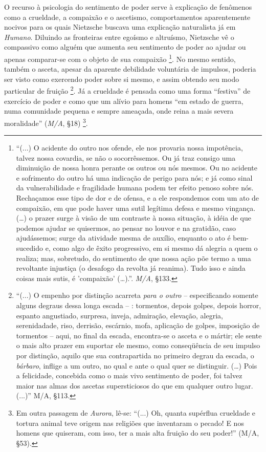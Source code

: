 \documentclass[
	12pt,				%
	openright,			%
	oneside,			%
	a4paper,			%
	english,			%
	french,				%
	spanish,			%
	brazil				%
	]{abntex2}
\begin{document}
	O recurso à psicologia do sentimento de poder serve à explicação de fenômenos como a crueldade, a compaixão e o ascetismo, comportamentos aparentemente nocivos para os quais Nietzsche buscava uma explicação naturalista já em \textit{Humano}. Diluindo as fronteiras entre egoísmo e altruísmo, Nietzsche vê o compassivo como alguém que aumenta seu sentimento de poder ao ajudar ou apenas comparar-se com o objeto de sua compaixão
\footnote{“(...) O acidente do outro nos ofende, ele nos provaria nossa impotência, talvez nossa covardia, se não o socorrêssemos. Ou já traz consigo uma diminuição de nossa honra perante os outros ou nós mesmos. Ou no acidente e sofrimento do outro há uma indicação de perigo para nós; e já como sinal da vulnerabilidade e fragilidade humana podem ter efeito penoso sobre nós. Rechaçamos esse tipo de dor e de ofensa, e a ele respondemos com um ato de compaixão, em que pode haver uma sutil legítima defesa e mesmo vingança. (…) o prazer surge à visão de um contraste à nossa situação, à idéia de que podemos ajudar se quisermos, ao pensar no louvor e na gratidão, caso ajudássemos; surge da atividade mesma de auxílio, enquanto o ato é bem-sucedido e, como algo de êxito progressivo, em si mesmo dá alegria a quem o realiza; mas, sobretudo, do sentimento de que nossa ação põe termo a uma revoltante injustiça (o desafogo da revolta já reanima). Tudo isso e ainda coisas mais sutis, é 'compaixão' (…).”. \textit{M/A}, §133.}. 
No mesmo sentido, também o asceta, apesar da aparente debilidade voluntária de impulsos, poderia ser visto como exercendo poder sobre si mesmo, e assim obtendo seu modo particular de fruição
\footnote{“(...) O empenho por distinção acarreta \textit{para o outro} – especificando somente alguns degraus dessa longa escada – : tormentos, depois golpes, depois horror, espanto angustiado, surpresa, inveja, admiração, elevação, alegria, serenidadade, riso, derrisão, escárnio, mofa, aplicação de golpes, imposição de tormentos – aqui, no final da escada, encontra-se o asceta e o mártir; ele sente o mais alto prazer em suportar ele mesmo, como conseqüência de seu impulso por distinção, aquilo que sua contrapartida no primeiro degrau da escada, o \textit{bárbaro}, inflige a um outro, no qual e ante o qual quer se distinguir. (…) Pois a felicidade, concebida como o mais vivo sentimento de poder, foi talvez maior nas almas dos ascetas supersticiosos do que em qualquer outro lugar. (...)” M/A, §113. }. 
Já a crueldade é pensada como uma forma “festiva” de exercício de poder e como que um alívio para homens “em estado de guerra, numa comunidade pequena e sempre ameaçada, onde reina a mais severa moralidade” (\textit{M/A}, §18)
\footnote{Em outra passagem de \textit{Aurora}, lê-se: “(...) Oh, quanta supérflua crueldade e tortura animal teve origem nas religiões que inventaram o pecado! E nos homens que quiseram, com isso, ter a mais alta fruição do seu poder!” (M/A, §53).}.
\end{document}
